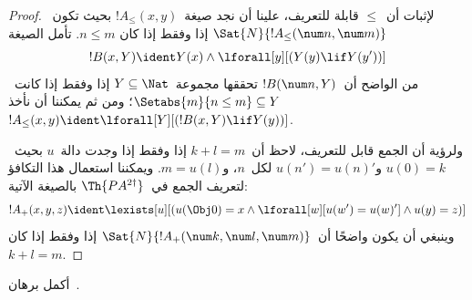 \documentclass[../../../include/open-logic-section]{subfiles}
\begin{document}
\begin{proof}
لإثبات أن~$\le$ قابلة للتعريف، علينا أن نجد صيغة~$!A_\le(x, y)$
بحيث تكون~$\Sat{N}{!A_\le(\num n, \num m)}$ إذا وفقط إذا كان
$n \le m$. تأمل الصيغة
\[
!B(x, Y) \ident Y(x) \land \lforall[y][(Y(y) \lif Y(y'))]
\]
من الواضح أن~$!B(\num n, Y)$ تحققها مجموعة~$Y \subseteq \Nat$ إذا
وفقط إذا كانت~$\Setabs{m}{n \le m} \subseteq Y$؛ ومن ثم يمكننا أن
نأخذ~$!A_\le(x, y) \ident
\lforall[Y][(!B(x, Y) \lif Y(y))]$.

ولرؤية أن الجمع قابل للتعريف، لاحظ أن~$k+l=m$ إذا وفقط إذا وجدت
دالة~$u$ بحيث~$u(0)=k$ و$u(n')=u(n)'$ لكل~$n$، و$m = u(l)$.
ويمكننا استعمال هذا التكافؤ لتعريف الجمع في~$\Th{PA^{2\dagger}}$
بالصيغة الآتية:
\[
!A_+(x,y,z) \ident \lexists[u][(u(\Obj 0)=x \land \lforall[w][u(w')=u
 (w)'] \land u(y)=z)]
\] 
وينبغي أن يكون واضحًا أن~$\Sat{N}{!A_+(\num k, \num l, \num m)}$
إذا وفقط إذا كان~$k+l=m$.
\end{proof}

\begin{prob}
أكمل برهان~.
\end{prob}
\end{document}
